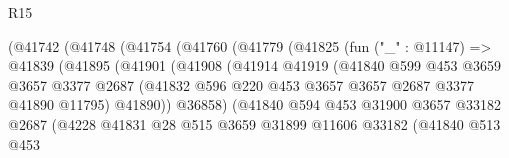 \begin{lexlean}{R15}
\begin{coremodule}
                          (@41742
                            (@41748
                              (@41754
                                (@41760
                                  (@41779
                                    (@41825
                                      (fun ("_" : @11147) =>
                                      @41839
                                        (@41895
                                          (@41901
                                            (@41908
                                              (@41914
                                                @41919
                                                (@41840
                                                  @599
                                                  @453
                                                  @3659
                                                  @3657
                                                  @3377
                                                  @2687
                                                  (@41832
                                                    @596
                                                    @220
                                                    @453
                                                    @3657
                                                    @3657
                                                    @2687
                                                    @3377
                                                    @41890
                                                    @11795)
                                                  @41890))
                                              @36858)
                                            (@41840
                                              @594
                                              @453
                                              @31900
                                              @3657
                                              @33182
                                              @2687
                                              (@4228
                                                @41831
                                                @28
                                                @515
                                                @3659
                                                @31899
                                                @11606
                                                @33182
                                                (@41840
                                                  @513
                                                  @453

\end{coremodule}
\end{lexlean}
